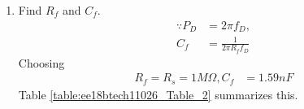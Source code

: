 \begin{enumerate}[label=\arabic*.,ref=\theenumi]
%
\begin{figure}[!ht]
	\begin{center}
				\resizebox{\columnwidth}{!}{}
	\end{center}
\caption{}
\label{fig:ee18btech110026_circuit_1}
\end{figure}
%
%

\item Find $R_f$ and $C_f$.
\\
\solution
\begin{align}
\because P_{D} &=2\pi  f_{D},
\\
C_{f} &= \frac{1}{2\pi R_{f}f_{D}}
\end{align}
%
Choosing
\begin{align}
R_{f} = R_{s}=1M\Omega,
 C_{f} &= 1.59nF
\end{align}
%
Table \ref{table:ee18btech11026_Table_2} summarizes this.
%
\begin{table}[!ht]
\centering

\caption{}
\label{table:ee18btech11026_Table_2}
\end{table}


\end{enumerate}
